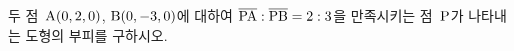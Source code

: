 두 점~$\mathrm{A}(0{,}\mkern3mu\mathopen{}2{,}\mkern3mu\mathopen{}0)$, $\mathrm{B}(0{,}\mkern3mu\mathopen{}-3{,}\mkern3mu\mathopen{}0)$에 대하여 $\overline{\mathrm{PA}}:\overline{\mathrm{PB}}=2:3$을 만족시키는 점~$\mathrm{P}$가 나타내는 도형의 부피를 구하시오.
